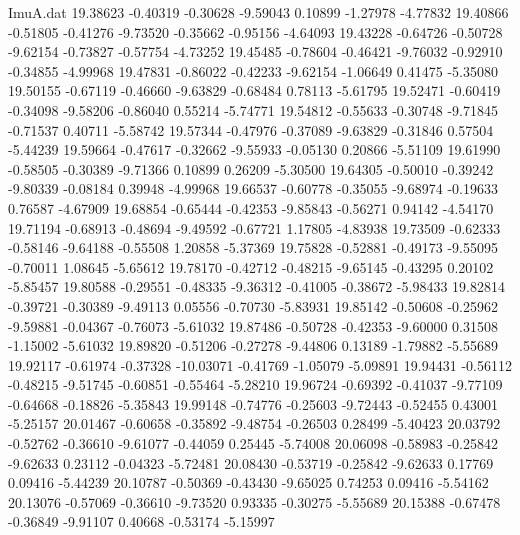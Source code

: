 \begin{filecontents}{ImuA.dat}
  19.38623   -0.40319   -0.30628   -9.59043    0.10899   -1.27978   -4.77832
  19.40866   -0.51805   -0.41276   -9.73520   -0.35662   -0.95156   -4.64093
  19.43228   -0.64726   -0.50728   -9.62154   -0.73827   -0.57754   -4.73252
  19.45485   -0.78604   -0.46421   -9.76032   -0.92910   -0.34855   -4.99968
  19.47831   -0.86022   -0.42233   -9.62154   -1.06649    0.41475   -5.35080
  19.50155   -0.67119   -0.46660   -9.63829   -0.68484    0.78113   -5.61795
  19.52471   -0.60419   -0.34098   -9.58206   -0.86040    0.55214   -5.74771
  19.54812   -0.55633   -0.30748   -9.71845   -0.71537    0.40711   -5.58742
  19.57344   -0.47976   -0.37089   -9.63829   -0.31846    0.57504   -5.44239
  19.59664   -0.47617   -0.32662   -9.55933   -0.05130    0.20866   -5.51109
  19.61990   -0.58505   -0.30389   -9.71366    0.10899    0.26209   -5.30500
  19.64305   -0.50010   -0.39242   -9.80339   -0.08184    0.39948   -4.99968
  19.66537   -0.60778   -0.35055   -9.68974   -0.19633    0.76587   -4.67909
  19.68854   -0.65444   -0.42353   -9.85843   -0.56271    0.94142   -4.54170
  19.71194   -0.68913   -0.48694   -9.49592   -0.67721    1.17805   -4.83938
  19.73509   -0.62333   -0.58146   -9.64188   -0.55508    1.20858   -5.37369
  19.75828   -0.52881   -0.49173   -9.55095   -0.70011    1.08645   -5.65612
  19.78170   -0.42712   -0.48215   -9.65145   -0.43295    0.20102   -5.85457
  19.80588   -0.29551   -0.48335   -9.36312   -0.41005   -0.38672   -5.98433
  19.82814   -0.39721   -0.30389   -9.49113    0.05556   -0.70730   -5.83931
  19.85142   -0.50608   -0.25962   -9.59881   -0.04367   -0.76073   -5.61032
  19.87486   -0.50728   -0.42353   -9.60000    0.31508   -1.15002   -5.61032
  19.89820   -0.51206   -0.27278   -9.44806    0.13189   -1.79882   -5.55689
  19.92117   -0.61974   -0.37328  -10.03071   -0.41769   -1.05079   -5.09891
  19.94431   -0.56112   -0.48215   -9.51745   -0.60851   -0.55464   -5.28210
  19.96724   -0.69392   -0.41037   -9.77109   -0.64668   -0.18826   -5.35843
  19.99148   -0.74776   -0.25603   -9.72443   -0.52455    0.43001   -5.25157
  20.01467   -0.60658   -0.35892   -9.48754   -0.26503    0.28499   -5.40423
  20.03792   -0.52762   -0.36610   -9.61077   -0.44059    0.25445   -5.74008
  20.06098   -0.58983   -0.25842   -9.62633    0.23112   -0.04323   -5.72481
  20.08430   -0.53719   -0.25842   -9.62633    0.17769    0.09416   -5.44239
  20.10787   -0.50369   -0.43430   -9.65025    0.74253    0.09416   -5.54162
  20.13076   -0.57069   -0.36610   -9.73520    0.93335   -0.30275   -5.55689
  20.15388   -0.67478   -0.36849   -9.91107    0.40668   -0.53174   -5.15997

\end{filecontents}
